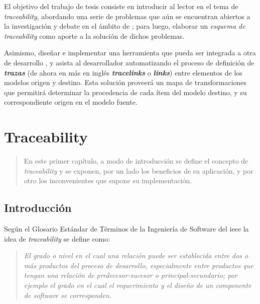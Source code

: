 \documentclass[a4paper,12pt,oneside,spanish]{book}
\begin{document}
El objetivo del trabajo de tesis consiste en introducir al lector en el tema de \textit{traceability}, abordando una serie de problemas que aún se encuentran abiertos a la investigación y debate en el ámbito de ; para luego, elaborar un \textit{esquema de traceability} como aporte a la solución de dichos problemas.

Asimismo, diseñar e implementar una herramienta que pueda ser integrada a otra de desarrollo , y asista al desarrollador automatizando el proceso de definición de \textit{\textbf{trazas}} (de ahora en más en inglés \textit{\textbf{tracelinks}} o \textit{\textbf{links}}) entre elementos de los modelos origen y destino. Esta solución proveerá un mapa de transformaciones que permitirá determinar la procedencia de cada ítem del modelo destino, y su correspondiente origen en el modelo fuente.


\mainmatter

\chapter{Traceability}

\begin{quotation}
En este primer capítulo, a modo de introducción se define el concepto de \textit{traceability} y se exponen, por un lado los beneficios de su aplicación, y por otro los inconvenientes que supone su implementación.
\end{quotation}

\bigskip

\minitoc 

\pagebreak

\section{Introducción}

Según el Glosario Estándar de Términos de la Ingeniería de Software del \gls{ieee} \cite{IEEE} la idea de \textit{traceability} se define como: 
\begin{quote}
\small \textit{El grado o nivel en el cual una relación puede ser establecida entre dos o más productos del proceso de desarrollo, especialmente entre productos que tengan una relación de predecesor-sucesor o principal-secundario; por ejemplo el grado en el cual el requerimiento y el diseño de un componente de software se corresponden}.
\end{quote}
\end{document}
